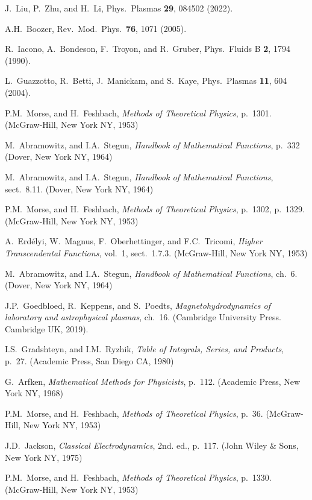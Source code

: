 \documentclass[12pt,prb,aps]{revtex4-1}
\begin{document}
\begin{thebibliography}{99}
 J.~Liu, P.~Zhu, and H.~Li, Phys.\ Plasmas  {\bf 29}, 084502 (2022).  

  A.H.~Boozer, Rev.\ Mod.\ Phys.\ {\bf 76}, 1071 (2005).

 R.~Iacono, A.~Bondeson, F.~Troyon, and R.~Gruber, Phys.\ Fluids B {\bf 2}, 1794 (1990).

 L.~Guazzotto,  R.~Betti, J.~Manickam, and  S.~Kaye, Phys.\ Plasmas {\bf 11}, 604 (2004).

 P.M.~Morse, and H.~Feshbach, {\em Methods of Theoretical Physics}, p.~1301. (McGraw-Hill, New York NY, 1953)

 M.~Abramowitz, and I.A.~Stegun, {\em Handbook of Mathematical Functions}, p.~332 (Dover, New York NY, 1964)

 M.~Abramowitz, and I.A.~Stegun, {\em Handbook of Mathematical Functions}, sect.~8.11. (Dover, New York NY, 1964)

 P.M.~Morse, and H.~Feshbach, {\em Methods of Theoretical Physics}, p.~1302, p.~1329. (McGraw-Hill, New York NY, 1953)

 A.~Erd\'{e}lyi, W.~Magnus, F.~Oberhettinger, and F.C.~Tricomi, {\em Higher Transcendental Functions}, vol.~1, sect.~1.7.3. 
(McGraw-Hill, New York NY, 1953)

 M.~Abramowitz, and I.A.~Stegun, {\em Handbook of Mathematical Functions}, ch.~6. (Dover, New York NY, 1964)

 J.P.~Goedbloed, R.~Keppens, and S.~Poedts, {\em Magnetohydrodynamics of laboratory and astrophysical plasmas}, ch.~16. (Cambridge University Press. Cambridge UK, 2019). 

 I.S.~Gradshteyn,  and I.M.~Ryzhik, {\em Table of Integrals, Series, and Products}, p.~27. (Academic Press, San Diego CA, 1980)

 G.~Arfken, {\em Mathematical Methods for Physicists}, p.~112. (Academic Press, New York NY, 1968) 

 P.M.~Morse, and H.~Feshbach, {\em Methods of Theoretical Physics}, p.~36. (McGraw-Hill, New York NY, 1953)

 J.D.~Jackson, {\em Classical Electrodynamics}, 2nd. ed., p.~117. (John Wiley \& Sons, New York NY, 1975)

 P.M.~Morse, and H.~Feshbach, {\em Methods of Theoretical Physics}, p.~1330. (McGraw-Hill, New York NY, 1953)


\end{thebibliography}
\end{document}

